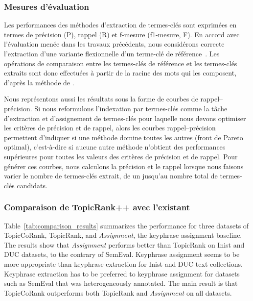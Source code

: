       \subsubsection{Mesures d'évaluation}
      \label{subsubsec:main-automatic_keyphrase_annotation-supervised_automatic_keyphrase_annotation-evaluation-evaluation_measures}
        Les performances des méthodes d'extraction de termes-clés sont exprimées
        en termes de précision (P), rappel (R) et f-mesure (f1-mesure, F). En
        accord avec l'évaluation menée dans les travaux précédents, nous
        considérons correcte l'extraction d'une variante flexionnelle d'un
        terme-clé de référence~\cite{kim2010semeval}. Les opérations de
        comparaison entre les termes-clés de référence et les termes-clés
        extraits sont donc effectuées à partir de la racine des mots qui les
        composent, d'après la méthode de .

        Nous représentons aussi les résultats sous la forme de courbes de
        rappel--précision. Si nous reformulons l'indexation par termes-clés
        comme la tâche d'extraction et d'assignement de termes-clés pour
        laquelle nous devons optimiser les critères de précision et de rappel,
        alors les courbes rappel--précision permettent d'indiquer si une méthode
        domine toutes les autres (front de Pareto optimal), c'est-à-dire si
        aucune autre méthode n'obtient des performances supérieures pour toutes
        les valeurs des critères de précision et de rappel. Pour générer ces
        courbes, nous calculons la précision et le rappel lorsque nous faisons
        varier le nombre de termes-clés extrait, de un jusqu'au nombre total de
        termes-clés candidats.
      
      \subsubsection{Comparaison de TopicRank++ avec l'existant}
      \label{subsubsec:main-automatic_keyphrase_annotation-supervised_automatic_keyphrase_annotation-evaluation-comparison}
        Table~\ref{tab:comparison_results} summarizes the performance for three datasets of TopicCoRank,  TopicRank, and \textit{Assignment}, the keyphrase assignment baseline.
        The results show that \textit{Assignment} performs better than TopicRank on Inist and DUC datasets, to the contrary of
        SemEval. 
        Keyphrase assignment seems to be more appropriate than keyphrase extraction for Inist and DUC text collections.
        Keyphrase extraction has to be preferred to keyphrase assignment for datasets such as SemEval that was heterogeneously annotated. 
        The main result is that TopicCoRank outperforms both TopicRank and \textit{Assignment} on all
        datasets. 
    
